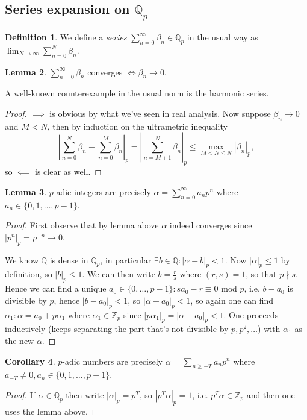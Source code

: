 \documentclass{article}
\newcommand{\Z}{\mathbb{Z}}
\newcommand{\Q}{\mathbb{Q}}
\newcommand{\Mod}{\text{ mod }}
\theoremstyle{definition}
\newtheorem{defn}{Definition}[subsection]
\newtheorem{lemma}[defn]{Lemma}
\newtheorem{coro}[defn]{Corollary}
\begin{document}
\subsection{Series expansion on $\Q_p$}
\begin{defn}
We define a \textit{series} $\sum_{n=0}^\infty\beta_n\in\Q_p$ in the usual way as $\lim_{N\rightarrow\infty}\sum_{n=0}^N\beta_n$.
\end{defn}
\begin{lemma}
$\sum_{n=0}^\infty\beta_n$ converges $\iff\beta_n\rightarrow 0$.
\end{lemma}
A well-known counterexample in the usual norm is the harmonic series.
\begin{proof}
$\implies$ is obvious by what we've seen in real analysis. Now suppose $\beta_n\rightarrow 0$ and $M<N$, then by induction on the ultrametric inequality
\[
\left|\sum_{n=0}^N\beta_n-\sum_{n=0}^M\beta_n\right|_p=\left|\sum_{n=M+1}^N\beta_n\right|_p\leq \max_{M<N\leq N} |\beta_n|_p,
\]
so $\impliedby$ is clear as well.
\end{proof}

\begin{lemma}
\label{lemma:padicasseries}
$p$-adic integers are precisely $\alpha=\sum_{n=0}^\infty a_np^n$ where $a_n\in\{0,1,\ldots,p-1\}$.
\end{lemma}
\begin{proof}
First observe that by lemma above $\alpha$ indeed converges since $|p^n|_p=p^{-n}\rightarrow 0$.

We know $\Q$ is dense in $\Q_p$, in particular $\exists b\in\Q:|\alpha-b|_p<1$. Now $|\alpha|_p\leq 1$ by definition, so $|b|_p\leq 1$. We can then write $b=\frac{r}{s}$ where $(r,s)=1$, so that $p\nmid s$. Hence we can find a unique $a_0\in\{0,\ldots,p-1\}:sa_0-r\equiv 0\Mod p$, i.e. $b-a_0$ is divisible by $p$, hence $|b-a_0|_p<1$, so $|\alpha-a_0|_p<1$, so again one can find $\alpha_1:\alpha=a_0+p\alpha_1$ where $\alpha_1\in\Z_p$ since $|p\alpha_1|_p=|\alpha-a_0|_p<1$. One proceeds inductively (keeps separating the part that's not divisible by $p,p^2,\ldots$) with $\alpha_1$ as the new $\alpha$.
\end{proof}

\begin{coro}
$p$-adic numbers are precisely $\alpha=\sum_{n\geq -T}a_np^n$ where $a_{-T}\neq 0,a_n\in\{0,1,\ldots,p-1\}$.
\end{coro}
\begin{proof}
If $\alpha\in\Q_p$ then write $|\alpha|_p=p^T$, so $|p^T\alpha|_p=1$, i.e. $p^T\alpha\in\Z_p$ and then one uses the lemma above.
\end{proof}
\end{document}
